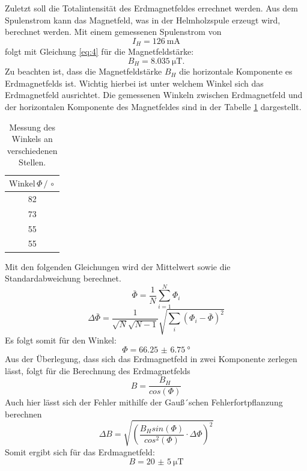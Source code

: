 Zuletzt soll die Totalintensität des Erdmagnetfeldes errechnet werden.
Aus dem Spulenstrom kann das Magnetfeld, was in der Helmholzspule erzeugt wird,
berechnet werden.
Mit einem gemessenen Spulenstrom von
\begin{equation*}
  I_H =\SI{126}{\milli\ampere}
\end{equation*}
folgt mit Gleichung \ref{eq:4} für die Magnetfeldstärke:
\begin{equation*}
  B_H =\SI{8.035}{\micro\tesla}.
\end{equation*}
Zu beachten ist, dass die Magnetfeldstärke $B_H$ die horizontale Komponente es Erdmagnetfelds ist.
Wichtig hierbei ist unter welchem Winkel sich das Erdmagnetfeld ausrichtet.
Die gemessenen Winkeln zwischen Erdmagnetfeld und der horizontalen Komponente des Magnetfeldes
sind in der Tabelle \ref{tab:7} dargestellt.
\begin{table}[H]
  \centering
  \caption{Messung des Winkels an verschiedenen Stellen.}
  \label{tab:7}
  \begin{tabular}{c}
\toprule
$\text{Winkel}\, \Phi \,/\, \circ$\\
\midrule
82\\
73\\
55\\
55\\
\bottomrule
  \end{tabular}
\end{table}
Mit den folgenden Gleichungen wird der Mittelwert sowie die Standardabweichung berechnet.
\begin{equation*}
  \bar{\Phi}= \frac{1}{N} \sum_{i=1}^{N} \Phi_{i}
\end{equation*}
\begin{equation*}
\Delta \bar{\Phi} = \frac{1}{\sqrt{N}\sqrt{N-1}} \sqrt{\sum_{i}(\Phi_{i}-\bar{\Phi})^2}
\end{equation*}
Es folgt somit für den Winkel:
\begin{equation*}
  \Phi = \SI{66.25(675)}{\degree}
\end{equation*}
Aus der Überlegung, dass sich das Erdmagnetfeld in zwei Komponente zerlegen lässt, folgt für die Berechnung des Erdmagnetfelds
\begin{equation*}
  B = \frac{B_H}{cos(\Phi)}
\end{equation*}
Auch hier lässt sich der Fehler mithilfe der Gauß´schen Fehlerfortpflanzung berechnen
\begin{equation*}
  \Delta B = \sqrt{(\frac{B_H sin(\Phi)}{cos^2(\Phi)} \cdot \Delta \Phi)^2}
\end{equation*}
Somit ergibt sich für das Erdmagnetfeld:
\begin{equation*}
  B= \SI{20(5)}{\micro\tesla}
\end{equation*}
